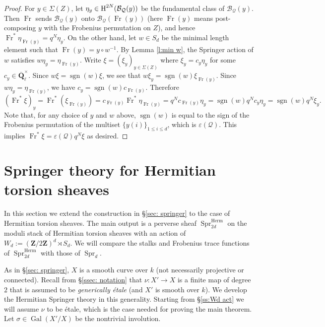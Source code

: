 \documentclass[reqno]{amsart}
\numberwithin{equation}{section}
\newcommand{\Q}{\mathbf{Q}}
\newcommand{\Z}{\mathbf{Z}}
\newcommand{\sgn}{\operatorname{sgn}}
\newcommand{\Gal}{\operatorname{Gal}}
\DeclareMathOperator{\Frob}{Fr}
\DeclareMathOperator{\Herm}{Herm}
\DeclareMathOperator{\Spr}{Spr}
\newcommand{\Qlbar}{\overline{\Q}_\ell}
\renewcommand\c{\circ}
\newcommand{\cohog}[2]{\textup{H}^{#1}({#2})}     %
\newcommand{\e}{\varepsilon}
\newcommand{\s}{\sigma}
\newcommand{\y}{\eta}
\newcommand\cB{\mathcal{B}}
\newcommand\cQ{\mathcal{Q}}
\theoremstyle{remark}
\numberwithin{equation}{section}
\begin{document}
\begin{proof}
For $y\in \Sigma(Z)$, let $\y_{y}\in \cohog{2N}{\cB_{\cQ}(y)}$ be the fundamental class of $\cB_{\cQ}(y)$. Then $\Frob$ sends $\cB_{\cQ}(y)$ onto $\cB_{\cQ}(\Frob(y))$ (here $\Frob(y)$ means post-composing $y$ with the Frobenius permutation on $Z$), and hence $\Frob^{*}\y_{\Frob(y)}=q^{N}\y_{y}$. On the other hand, let $w\in S_{d}$ be the minimal length element such that $\Frob(y)=y\c w^{-1}$. By Lemma \ref{l:min w}, the Springer action of $w$ satisfies $w\y_{y}=\y_{\Frob(y)}$. Write  $\xi=(\xi_{y})_{y\in \Sigma(Z)}$ where $\xi_{y}=c_{y}\y_{y}$ for some $c_{y}\in \Qlbar^{\times}$. Since $w\xi=\sgn(w)\xi$, we see that $w\xi_{y}=\sgn(w)\xi_{\Frob(y)}$. Since  $w\y_{y}=\y_{\Frob(y)}$, we have $c_{y}=\sgn(w)c_{\Frob(y)}$. Therefore
\begin{equation*}
(\Frob^{*}\xi)_{y}=\Frob^{*}(\xi_{\Frob(y)})=c_{\Frob(y)}\Frob^{*}\y_{\Frob(y)}=q^{N}c_{\Frob(y)}\y_{y}=\sgn(w)q^{N}c_{y}\y_{y}=\sgn(w)q^{N}\xi_{y}.
\end{equation*}Note that, for any choice of $y$ and $w$ above, $\sgn(w)$ is equal to the sign of the Frobenius permutation of the multiset $\{y(i)\}_{1\le i\le d}$, which is $\e(\cQ)$. This implies $\Frob^{*}\xi=\e(\cQ)q^{N}\xi$ as desired.
\end{proof}



\section{Springer theory for Hermitian torsion sheaves}\label{sec: Herm}%

In this section we extend the construction in \S\ref{sec: springer} to the case of Hermitian torsion sheaves. The main output is a perverse sheaf $\Spr^{\Herm}_{2d}$ on the moduli stack of Hermitian torsion sheaves with an action of $W_{d}:=(\Z/2\Z)^{d}\rtimes S_{d}$. We will compare the stalks and Frobenius trace functions of $\Spr^{\Herm}_{2d}$ with those of $\Spr_{d}$.


As in \S\ref{sec: springer}, $X$ is a smooth curve over $k$ (not necessarily projective or connected). Recall from \S \ref{ssec: notation} that $\nu: X'\to X$ is a finite map of degree $2$ that is assumed to be {\em generically  \'etale} (and $X'$ is smooth over $k$). We develop the Hermitian  Springer theory in this generality.  Starting from \S\ref{ss:Wd act} we will assume $\nu$ to be \'etale, which is the case needed for proving the main theorem. Let $\s\in\Gal(X'/X)$ be the nontrivial involution. 
\end{document}
